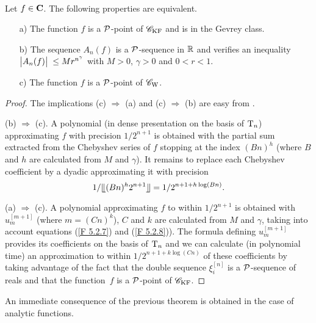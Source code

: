 \begin{theorem} \label{527}~ 

\noindent 
Let $f \in {\bf C}$. The following properties are equivalent.

\begin{itemize}
%
\item [a)]
 The function $f$ is a ${\cal P}$-point of ${{{\mathscr C}}_{\rm KF}}$ and is in the Gevrey class.

\item  [b)]  The sequence $A_n(f)$ is a ${\cal P}$-sequence in $\mathbb {R}$ and verifies an inequality $\big|{A_n(f)}\big|\; \leq Mr^{n^{\gamma}}$ with $M > 0$, $\gamma > 0$ and $0 < r < 1$. 

\item  [c)] The function $f$ is a ${\cal P}$-point of ${{{\mathscr C}}_{\rm W}}$.
\end{itemize}
\end{theorem}
%
\begin{proof}
The implications (c) $\Rightarrow$ (a) and (c) $\Rightarrow$ (b) are easy from . 

\noindent 
(b) $\Rightarrow$ (c). A polynomial (in dense presentation on the basis of ${\rm T}_n$) approximating $f$ with precision $1/2^{n+1}$ is obtained with the partial sum extracted from the Chebyshev series of $f$ stopping at the index $(Bn)^h$ (where $B$ and $h$ are calculated from $M$ and $\gamma$). It remains to replace each Chebyshev coefficient by a dyadic approximating it with precision 
\[
1/ \llfloor (Bn)^h2^{n+1} \rrfloor  = 1/2^{n+1+h \log(Bn)}.
\]

\noindent 
(a) $\Rightarrow$ (c). A polynomial approximating $f$ to within $1/2^{n+1}$ is obtained with $u_m^{[m+1]}$ (where $m = (Cn)^k$), $C$ and $k$ are calculated from $M$ and $\gamma$, taking into account equations (\ref{F 5.2.7}) and (\ref{F 5.2.8})). 
The formula defining $u_m^{[m+1]}$ provides its coefficients on the basis of ${\rm T}_n$ and we can calculate (in polynomial time) an approximation to within $1/2^{n+1+k \log(Cn)}$ of these coefficients by taking advantage of the fact that the double sequence $\xi_i^{[n]}$ is a ${\cal P}$-sequence of reals and that the function~$f$ is a ${\cal P}$-point of ${{{\mathscr C}}_{\rm KF}}$. 
\end{proof}

An immediate consequence of the previous theorem is obtained in the case of analytic functions.

